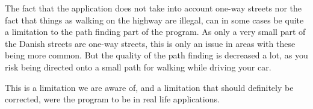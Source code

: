 The fact that the application does not take into account one-way streets nor the fact that things as walking on the highway are illegal, can in some cases be quite a limitation to the path finding part of the program. As only a very small part of the Danish streets are one-way streets, this is only an issue in areas with these being more common. But the quality of the path finding is decreased a lot, as you risk being directed onto a small path for walking while driving your car.

This is a limitation we are aware of, and a limitation that should definitely be corrected, were the program to be in real life applications.